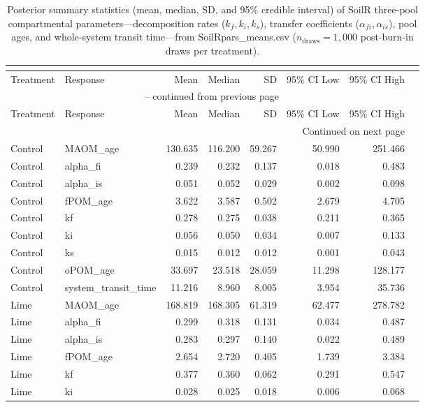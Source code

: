 \documentclass[preprint,12pt]{elsarticle}
\begin{document}
\begin{landscape}
\newpage

\begin{longtable}{llrrrrrr}
\caption{Posterior summary statistics (mean, median, SD, and 95\% credible interval) of SoilR three-pool compartmental parameters—decomposition rates ($k_f, k_i, k_s$), transfer coefficients ($\alpha_{fi}, \alpha_{is}$), pool ages, and whole-system transit time—from SoilRpars_means.csv ($n_{\text{draws}} = 1,000$ post-burn-in draws per treatment).}\\
\label{tab:soilr_means}\\
\toprule
Treatment & Response & Mean & Median & SD & 95\% CI Low & 95\% CI High \\
\midrule
\endfirsthead
\multicolumn{7}{c}{{\tablename\ \thetable{} -- continued from previous page}} \\
\toprule
Treatment & Response & Mean & Median & SD & 95\% CI Low & 95\% CI High \\
\midrule
\endhead
\midrule \multicolumn{7}{r}{{Continued on next page}} \\ \endfoot
\bottomrule \endlastfoot
Control & MAOM\_age & 130.635 & 116.200 & 59.267 & 50.990 & 251.466 \\
Control & alpha\_fi & 0.239 & 0.232 & 0.137 & 0.018 & 0.483 \\
Control & alpha\_is & 0.051 & 0.052 & 0.029 & 0.002 & 0.098 \\
Control & fPOM\_age & 3.622 & 3.587 & 0.502 & 2.679 & 4.705 \\
Control & kf & 0.278 & 0.275 & 0.038 & 0.211 & 0.365 \\
Control & ki & 0.056 & 0.050 & 0.034 & 0.007 & 0.133 \\
Control & ks & 0.015 & 0.012 & 0.012 & 0.001 & 0.043 \\
Control & oPOM\_age & 33.697 & 23.518 & 28.059 & 11.298 & 128.177 \\
Control & system\_transit\_time & 11.216 & 8.960 & 8.005 & 3.954 & 35.736 \\
Lime & MAOM\_age & 168.819 & 168.305 & 61.319 & 62.477 & 278.782 \\
Lime & alpha\_fi & 0.299 & 0.318 & 0.131 & 0.034 & 0.487 \\
Lime & alpha\_is & 0.283 & 0.297 & 0.140 & 0.022 & 0.489 \\
Lime & fPOM\_age & 2.654 & 2.720 & 0.405 & 1.739 & 3.384 \\
Lime & kf & 0.377 & 0.360 & 0.062 & 0.291 & 0.547 \\
Lime & ki & 0.028 & 0.025 & 0.018 & 0.006 & 0.068 \\

\end{longtable}
\end{landscape}
\end{document}

